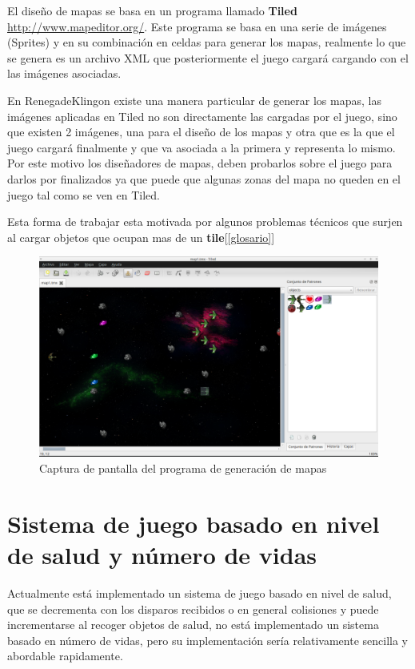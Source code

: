 El diseño de mapas se basa en un programa llamado \textbf{Tiled} \url{http://www.mapeditor.org/}.
Este programa se basa en una serie de imágenes (Sprites) y en su combinación en celdas para generar los mapas, realmente lo que se genera es un archivo XML que posteriormente el juego cargará cargando con el las imágenes asociadas.

En RenegadeKlingon existe una manera particular de generar los mapas, las imágenes aplicadas en Tiled no son directamente las cargadas por el juego, sino que existen 2 imágenes, una para el diseño de los mapas y otra que es la que el juego cargará finalmente y que va asociada a la primera y representa lo mismo. Por este motivo los diseñadores de mapas, deben probarlos sobre el juego para darlos por finalizados ya que puede que algunas zonas del mapa no queden en el juego tal como se ven en Tiled.

Esta forma de trabajar esta motivada por algunos problemas técnicos que surjen al cargar objetos que ocupan mas de un \textbf{tile}[\ref{glosario}]

\begin{figure}[t]
\centering
\includegraphics[width=\linewidth]{includes/images/tiled.png}
\caption{Captura de pantalla del programa de generación de mapas}
\label{fig:TiledScreenShoot}
\end{figure}

\section{Sistema de juego basado en nivel de salud y número de vidas}

Actualmente está implementado un sistema de juego basado en nivel de salud, que se decrementa con los disparos recibidos o en general colisiones y puede incrementarse al recoger objetos de salud, no está implementado un sistema basado en número de vidas, pero su implementación sería relativamente sencilla y abordable rapidamente.

